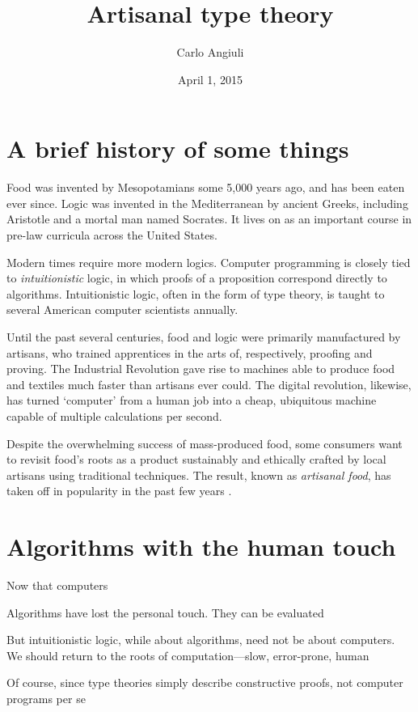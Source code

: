 \documentclass[10pt]{article}
\title{Artisanal type theory}
\author{Carlo Angiuli}
\date{April 1, 2015}
\begin{document}
\maketitle

\section{A brief history of some things}

Food was invented by Mesopotamians some 5,000 years ago, and has been eaten ever
since. 
%
Logic was invented in the Mediterranean by ancient Greeks, including Aristotle
and a mortal man \cite{Aristotle40} named Socrates. It lives on as an important
course in pre-law curricula across the United States. 

Modern times require more modern logics. Computer programming is closely tied to
\emph{intuitionistic} logic, in which proofs of a proposition correspond
directly to algorithms. Intuitionistic logic, often in the form of type theory,
is taught to several American computer scientists annually.

Until the past several centuries, food and logic were primarily manufactured by
artisans, who trained apprentices in the arts of, respectively, proofing and
proving.
%
The Industrial Revolution gave rise to machines able to produce food and
textiles much faster than artisans ever could.
%
The digital revolution, likewise, has turned `computer' from a human job into a
cheap, ubiquitous machine capable of multiple calculations per second.

Despite the overwhelming success of mass-produced food, some consumers want to
revisit food's roots as a product sustainably and ethically crafted by local
artisans using traditional techniques. The result, known as \emph{artisanal
food}, has taken off in popularity in the past few years \cite{NYT09,Cope14}.

\section{Algorithms with the human touch}

Now that computers 

Algorithms have lost the personal touch. They can be evaluated

But intuitionistic logic, while about algorithms, need not be about computers.
We should return to the roots of computation---slow, error-prone, human 


Of course, since type theories simply describe constructive proofs, not computer
programs per se \cite{MartinLof85}
\end{document}
